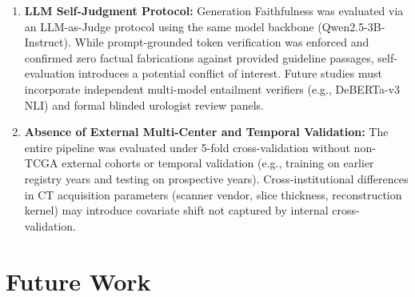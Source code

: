 \begin{enumerate}
    \item \textbf{LLM Self-Judgment Protocol:} Generation Faithfulness was evaluated via an LLM-as-Judge protocol using the same model backbone (Qwen2.5-3B-Instruct). While prompt-grounded token verification was enforced and confirmed zero factual fabrications against provided guideline passages, self-evaluation introduces a potential conflict of interest. Future studies must incorporate independent multi-model entailment verifiers (e.g., DeBERTa-v3 NLI) and formal blinded urologist review panels.
    \item \textbf{Absence of External Multi-Center and Temporal Validation:} The entire pipeline was evaluated under 5-fold cross-validation without non-TCGA external cohorts or temporal validation (e.g., training on earlier registry years and testing on prospective years). Cross-institutional differences in CT acquisition parameters (scanner vendor, slice thickness, reconstruction kernel) may introduce covariate shift not captured by internal cross-validation.
\end{enumerate}

\section{Future Work}
\label{sec:future_work}

